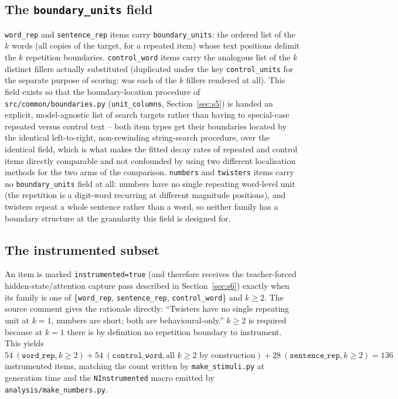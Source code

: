 \documentclass[11pt]{article}
\begin{document}
\subsection{The \texttt{boundary\_units} field}

\texttt{word\_rep} and \texttt{sentence\_rep} items carry
\texttt{boundary\_units}: the ordered list of the $k$ words (all copies of
the target, for a repeated item) whose text positions delimit the $k$
repetition boundaries. \texttt{control\_word} items carry the analogous list
of the $k$ distinct fillers actually substituted (duplicated under the key
\texttt{control\_units} for the separate purpose of scoring: was each of the
$k$ fillers rendered at all). This field exists so that the boundary-location
procedure of \texttt{src/common/boundaries.py}
(\texttt{unit\_columns}, Section~\ref{sec:s5}) is handed an explicit,
model-agnostic list of search targets rather than having to special-case
repeated versus control text -- both item types get their boundaries located
by the identical left-to-right, non-rewinding string-search procedure, over
the identical field, which is what makes the fitted decay rates of repeated
and control items directly comparable and not confounded by using two
different localisation methods for the two arms of the comparison.
\texttt{numbers} and \texttt{twisters} items carry no \texttt{boundary\_units}
field at all: numbers have no single repeating word-level unit (the
repetition is a digit-word recurring at different magnitude positions), and
twisters repeat a whole sentence rather than a word, so neither family has a
boundary structure at the granularity this field is designed for.

\subsection{The instrumented subset}

An item is marked \texttt{instrumented=true} (and therefore receives the
teacher-forced hidden-state/attention capture pass described in
Section~\ref{sec:s6}) exactly when its family is one of
\{\texttt{word\_rep}, \texttt{sentence\_rep}, \texttt{control\_word}\} and
$k\ge 2$. The source comment gives the rationale directly: ``Twisters have no
single repeating unit at $k=1$, numbers are short; both are behavioural-only.''
$k\ge2$ is required because at $k=1$ there is by definition no repetition
boundary to instrument. This yields $54\ (\texttt{word\_rep}, k\ge2) + 54\
(\texttt{control\_word}, \text{all } k\ge2\text{ by construction}) + 28\
(\texttt{sentence\_rep}, k\ge2) = 136$ instrumented items, matching the count
written by \texttt{make\_stimuli.py} at generation time and the
\texttt{NInstrumented} macro emitted by \texttt{analysis/make\_numbers.py}.
\end{document}
